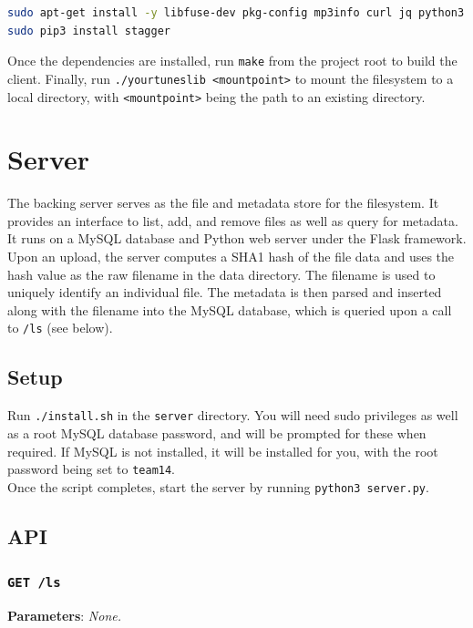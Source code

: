 \documentclass{article}
\begin{document}
\begin{lstlisting}[language=Bash]
sudo apt-get install -y libfuse-dev pkg-config mp3info curl jq python3
sudo pip3 install stagger
\end{lstlisting}
	
	\noindent Once the dependencies are installed, run \texttt{make} from the project root to build the client. Finally, run \texttt{./yourtuneslib <mountpoint>} to mount the filesystem to a local directory, with \texttt{<mountpoint>} being the path to an existing directory.
	
	\section{Server}
	The backing server serves as the file and metadata store for the filesystem. It provides an interface to list, add, and remove files as well as query for metadata. It runs on a MySQL database and Python web server under the Flask framework. \\
	
	\noindent Upon an upload, the server computes a SHA1 hash of the file data and uses the hash value as the raw filename in the data directory. The filename is used to uniquely identify an individual file. The metadata is then parsed and inserted along with the filename into the MySQL database, which is queried upon a call to \texttt{/ls} (see below).
	
	\subsection{Setup}
	Run \texttt{./install.sh} in the \texttt{server} directory. You will need sudo privileges as well as a root MySQL database password, and will be prompted for these when required. If MySQL is not installed, it will be installed for you, with the root password being set to \texttt{team14}. \\
	
	\noindent Once the script completes, start the server by running \texttt{python3 server.py}.
	
	\subsection{API}
	\subsubsection{\texttt{GET /ls}}
	\textbf{Parameters}: \textit{None.} \\
	
\end{document}
